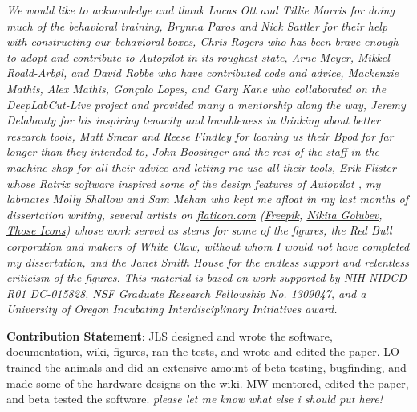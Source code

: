
\begin{acknowledgements}
\textit{We would like to acknowledge and thank Lucas Ott and Tillie Morris for doing much of the behavioral training, Brynna Paros and Nick Sattler for their help with constructing our behavioral boxes, Chris Rogers who has been brave enough to adopt and contribute to Autopilot in its roughest state, Arne Meyer, Mikkel Roald-Arbøl, and David Robbe who have contributed code and advice, Mackenzie Mathis, Alex Mathis, Gonçalo Lopes, and Gary Kane who collaborated on the DeepLabCut-Live project and provided many a mentorship along the way, Jeremy Delahanty for his inspiring tenacity and humbleness in thinking about better research tools, Matt Smear and Reese Findley for loaning us their Bpod for far longer than they intended to, John Boosinger and the rest of the staff in the machine shop for all their advice and letting me use all their tools, Erik Flister whose Ratrix software inspired some of the design features of Autopilot \citep{meierCollinearFeaturesImpair2011}, my labmates Molly Shallow and Sam Mehan who kept me afloat in my last months of dissertation writing, several artists on \url{flaticon.com} (\href{https://www.flaticon.com/authors/freepik}{Freepik}, \href{https://www.flaticon.com/authors/nikita-golubev}{Nikita Golubev}, \href{https://www.flaticon.com/authors/those-icons}{Those Icons}) whose work served as stems for some of the figures, the Red Bull corporation and makers of White Claw, without whom I would not have completed my dissertation, and the Janet Smith House for the endless support and relentless criticism of the figures. This material is based on work supported by NIH NIDCD R01 DC-015828, NSF Graduate Research Fellowship No. 1309047, and a University of Oregon Incubating Interdisciplinary Initiatives award.}

\textbf{Contribution Statement}: JLS designed and wrote the software, documentation, wiki, figures, ran the tests, and wrote and edited the paper. LO trained the animals and did an extensive amount of beta testing, bugfinding, and made some of the hardware designs on the wiki. MW mentored, edited the paper, and beta tested the software. \textit{please let me know what else i should put here!}

\end{acknowledgements}